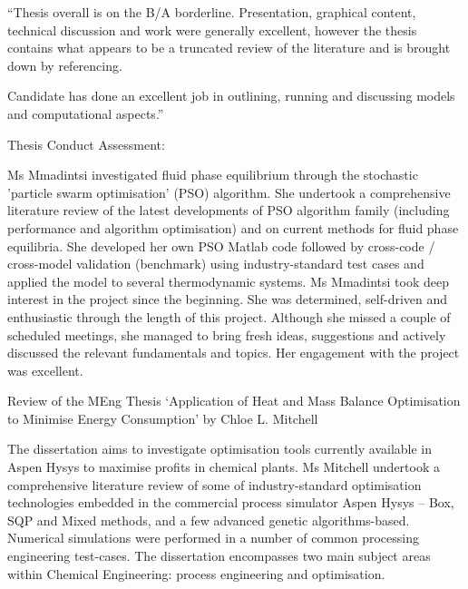 \documentclass[14pt,twoside]{report}
\begin{document}
\noindent
``Thesis overall is on the B/A borderline. Presentation, graphical content, technical discussion and work were generally excellent, however the thesis contains what appears to be a truncated review of the literature and is brought down by referencing.

Candidate has done an excellent job in outlining, running and discussing models and computational aspects.''

\clearpage

{\Large Thesis Conduct Assessment:}

\noindent
Ms Mmadintsi investigated fluid phase equilibrium through the stochastic 'particle swarm optimisation' (PSO) algorithm. She undertook a comprehensive literature review of the latest developments of PSO algorithm family (including performance and algorithm optimisation) and on current methods for fluid phase equilibria. She developed her own PSO Matlab code followed by cross-code / cross-model validation (benchmark) using industry-standard test cases and applied the model to several thermodynamic systems. Ms Mmadintsi took deep interest in the project since the beginning. She was determined, self-driven and enthusiastic through the length of this project. Although she missed a couple of scheduled meetings, she managed to bring fresh ideas, suggestions and actively discussed the relevant fundamentals and topics. Her engagement with the project was excellent. 



\clearpage



\bigskip

\begin{center}
  {\Large Review of the MEng Thesis `Application of Heat and Mass Balance Optimisation to Minimise Energy Consumption' by Chloe L. Mitchell}
\end{center}
The dissertation aims to investigate optimisation tools currently available in Aspen Hysys to maximise profits in chemical plants. Ms Mitchell undertook a comprehensive literature review of some of industry-standard optimisation technologies embedded in the commercial process simulator Aspen Hysys -- Box, SQP and Mixed methods, and a few advanced genetic algorithms-based. Numerical simulations were performed in a number of common processing engineering test-cases.  The dissertation encompasses two main subject areas within Chemical Engineering: process engineering and optimisation. 
\end{document}
